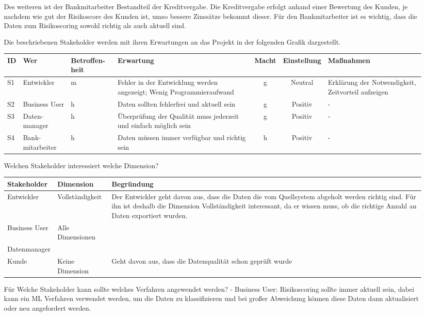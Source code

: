 Des weiteren ist der Bankmitarbeiter Bestandteil der Kreditvergabe. 
Die Kreditvergabe erfolgt anhand einer Bewertung des Kunden, je nachdem wie gut der Risikoscore des Kunden ist, umso bessere Zinssätze bekommt dieser.
Für den Bankmitarbeiter ist es wichtig, dass die Daten zum Risikoscoring sowohl richtig als auch aktuell sind.

Die beschriebenen Stakeholder werden mit ihren Erwartungen an das Projekt in der folgenden Grafik dargestellt.

\begin{tabular}[h]{l|p{2cm}|>{\centering}p{1.5cm}|p{2.5cm}|c|c|p{3cm}}
ID & Wer        & Betroffen-heit & Erwartung & Macht & Einstellung & Maßnahmen  \\ \hline
S1 & Entwickler & m             & Fehler in der Entwicklung werden angezeigt; Wenig Programmieraufwand & g & Neutral & Erklärung der Notwendigkeit, Zeitvorteil aufzeigen  \\ \hline
S2 & Business User & h          & Daten sollten fehlerfrei und aktuell sein & g & Positiv & - \\ \hline
S3 & Daten-manager & h          & Überprüfung der Qualität muss jederzeit und einfach möglich sein & g & Positiv & - \\ \hline
S4 & Bank-mitarbeiter & h          & Daten müssen immer verfügbar und richtig sein & h & Positiv & - \\
\end{tabular}


Welchen Stakeholder interessiert welche Dimension?

\begin{tabular}[h]{l|l|l}
Stakeholder & Dimension & Begründung \\ \hline
Entwickler & Vollständigkeit & Der Entwickler geht davon aus, dass die Daten die vom Quellsystem abgeholt werden richtig sind. Für ihn ist deshalb die Dimension Vollständigkeit interessant, da er wissen muss, ob die richtige Anzahl an Daten exportiert wurden. \\ \hline
Business User & Alle Dimensionen & \\ \hline
Datenmanager & & \\ \hline
Kunde & Keine Dimension & Geht davon aus, dass die Datenqualität schon geprüft wurde \\
\end{tabular}


Für Welche Stakeholder kann sollte welches Verfahren angewendet werden?
- Business User: Risikoscoring sollte immer aktuell sein, dabei kann ein ML Verfahren verwendet werden, um die Daten zu klassifizieren und bei großer Abweichung können diese Daten dann aktualisiert oder neu angefordert werden.


